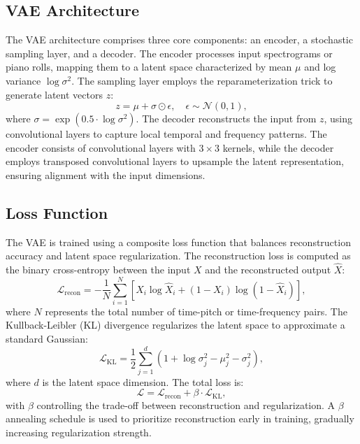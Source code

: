 \documentclass[conference]{IEEEtran}
\begin{document}
\subsection{VAE Architecture}
The VAE architecture comprises three core components: an encoder, a stochastic sampling layer, and a decoder. The encoder processes input spectrograms or piano rolls, mapping them to a latent space characterized by mean $\mu$ and log variance $\log\sigma^2$. The sampling layer employs the reparameterization trick to generate latent vectors $z$:
\begin{equation}
    z = \mu + \sigma \odot \epsilon, \quad \epsilon \sim \mathcal{N}(0, 1),
\end{equation}
where $\sigma = \exp(0.5 \cdot \log\sigma^2)$. The decoder reconstructs the input from $z$, using convolutional layers to capture local temporal and frequency patterns. The encoder consists of convolutional layers with $3 \times 3$ kernels, while the decoder employs transposed convolutional layers to upsample the latent representation, ensuring alignment with the input dimensions.

\subsection{Loss Function}
The VAE is trained using a composite loss function that balances reconstruction accuracy and latent space regularization. The reconstruction loss is computed as the binary cross-entropy between the input $X$ and the reconstructed output $\hat{X}$:
\begin{equation}
    \mathcal{L}_{\text{recon}} = -\frac{1}{N} \sum_{i=1}^N \left[ X_i \log \hat{X}_i + (1 - X_i) \log (1 - \hat{X}_i) \right],
\end{equation}
where $N$ represents the total number of time-pitch or time-frequency pairs. The Kullback-Leibler (KL) divergence regularizes the latent space to approximate a standard Gaussian:
\begin{equation}
    \mathcal{L}_{\text{KL}} = \frac{1}{2} \sum_{j=1}^d \left( 1 + \log\sigma_j^2 - \mu_j^2 - \sigma_j^2 \right),
\end{equation}
where $d$ is the latent space dimension. The total loss is:
\begin{equation}
    \mathcal{L} = \mathcal{L}_{\text{recon}} + \beta \cdot \mathcal{L}_{\text{KL}},
\end{equation}
with $\beta$ controlling the trade-off between reconstruction and regularization. A $\beta$ annealing schedule is used to prioritize reconstruction early in training, gradually increasing regularization strength.
\end{document}

